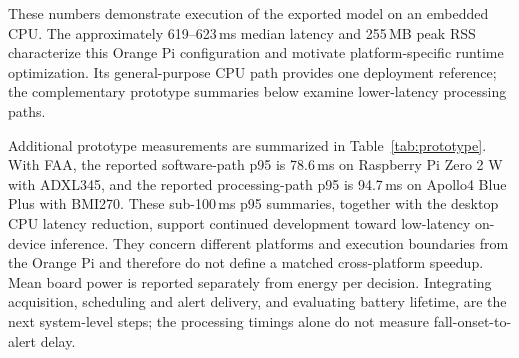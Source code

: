 \documentclass[jec]{acnsart}
\begin{document}
\begin{table}[htbp]
\caption{Real \mbox{on-device CPU benchmark} on Orange Pi AI Pro 20T 24G using the exported TorchScript model.}
\label{tab:orangepi_cpu}
\centering
\small
{}
\end{table}

These numbers demonstrate execution of the exported model on an embedded CPU. The approximately 619--623\,ms median latency and 255\,MB peak RSS characterize this Orange Pi configuration and motivate platform-specific runtime optimization. Its general-purpose CPU path provides one deployment reference; the complementary prototype summaries below examine lower-latency processing paths.

Additional prototype measurements are summarized in Table~\ref{tab:prototype}. With FAA, the reported software-path p95 is 78.6\,ms on Raspberry Pi Zero 2 W with ADXL345, and the reported processing-path p95 is 94.7\,ms on Apollo4 Blue Plus with BMI270. These sub-100\,ms p95 summaries, together with the desktop CPU latency reduction, support continued development toward low-latency on-device inference. They concern different platforms and execution boundaries from the Orange Pi and therefore do not define a matched cross-platform speedup. Mean board power is reported separately from energy per decision. Integrating acquisition, scheduling and alert delivery, and evaluating battery lifetime, are the next system-level steps; the processing timings alone do not measure fall-onset-to-alert delay.
\end{document}
